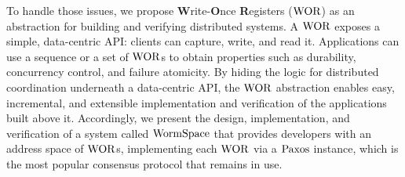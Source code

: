 To handle those issues, we propose \textbf{W}rite-\textbf{O}nce \textbf{R}egisters ($\mathrm{WOR}$) as an abstraction for building and verifying distributed systems.
 A $\mathrm{WOR}$ exposes a simple, data-centric API: clients can capture, write, and read it. Applications can use a sequence or a set of $\mathrm{WOR}$s to obtain properties such as durability, concurrency control, and failure atomicity.
  By hiding the logic for distributed coordination underneath a data-centric API, the $\mathrm{WOR}$ abstraction enables easy, incremental, and extensible implementation and verification of the applications built above it. 
  Accordingly, we present the design, implementation, and verification of a system called $\mathrm{WormSpace}$ that provides developers with an address space of $\mathrm{WOR}$s, implementing each $\mathrm{WOR}$ via a $\mathrm{Paxos}$ instance, which is the most popular consensus protocol that remains in use.



